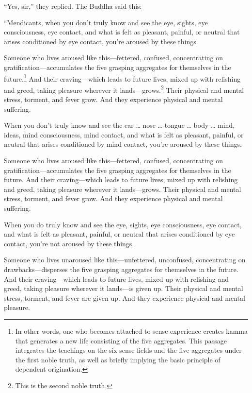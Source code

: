 \documentclass[12pt,openany]{book}%
\begin{document}
“Yes, sir,” they replied. The Buddha said this: 

“Mendicants, when you don’t truly know and see the eye, sights, eye consciousness, eye contact, and what is felt as pleasant, painful, or neutral that arises conditioned by eye contact, you’re aroused by these things. 

Someone who lives aroused like this—fettered, confused, concentrating on gratification—accumulates the five grasping aggregates for themselves in the future.\footnote{In other words, one who becomes attached to sense experience creates kamma that generates a new life consisting of the five aggregates. This passage integrates the teachings on the six sense fields and the five aggregates under the first noble truth, as well as briefly implying the basic principle of dependent origination. } And their craving—which leads to future lives, mixed up with relishing and greed, taking pleasure wherever it lands—grows.\footnote{This is the second noble truth. } Their physical and mental stress, torment, and fever grow. And they experience physical and mental suffering. 

When you don’t truly know and see the ear … nose … tongue … body … mind, ideas, mind consciousness, mind contact, and what is felt as pleasant, painful, or neutral that arises conditioned by mind contact, you’re aroused by these things. 

Someone who lives aroused like this—fettered, confused, concentrating on gratification—accumulates the five grasping aggregates for themselves in the future. And their craving—which leads to future lives, mixed up with relishing and greed, taking pleasure wherever it lands—grows. Their physical and mental stress, torment, and fever grow. And they experience physical and mental suffering. 

When you do truly know and see the eye, sights, eye consciousness, eye contact, and what is felt as pleasant, painful, or neutral that arises conditioned by eye contact, you’re not aroused by these things. 

Someone who lives unaroused like this—unfettered, unconfused, concentrating on drawbacks—disperses the five grasping aggregates for themselves in the future. And their craving—which leads to future lives, mixed up with relishing and greed, taking pleasure wherever it lands—is given up. Their physical and mental stress, torment, and fever are given up. And they experience physical and mental pleasure. 
\end{document}
